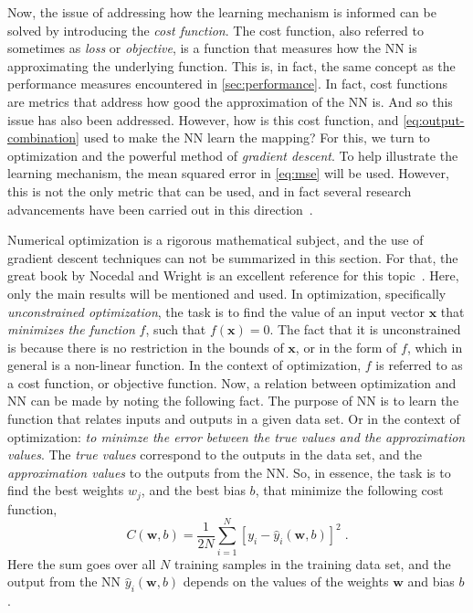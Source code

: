 Now, the issue of addressing how the learning mechanism is informed can be solved by 
introducing the \emph{cost function}. The cost function, also referred to sometimes as 
\emph{loss} or \emph{objective}, is a function that measures how the NN is approximating 
the underlying function. This is, in fact, the same concept as the performance measures 
encountered in \autoref{sec:performance}. In fact, cost functions are metrics that address 
how good the approximation of the NN is. And so this issue has also been addressed. 
However, how is this cost function, and \autoref{eq:output-combination} used to make the NN 
learn the mapping? For this, we turn to optimization and the powerful method of \emph{gradient descent}. To help illustrate the learning mechanism, the mean squared error in 
\autoref{eq:mse} will be used. However, this is not the only metric that can be used, and 
in fact several research advancements have been carried out in this direction~\cite{fontenla-romeroNewConvexObjective2010,liDiversityPromotingObjectiveFunction2016}.

Numerical optimization is a rigorous mathematical subject, and the use of gradient descent techniques can not be summarized in this section. For that, the great book by Nocedal and Wright is an excellent reference for this topic~\cite{nocedalNumericalOptimization2006}.
Here, only the main results will be mentioned and used. In optimization, specifically \emph{unconstrained optimization}, the task is to find the value of an input vector \(\mathbf{x}\) that \emph{minimizes the function} \(f\), such that \(f(\mathbf{x}) = 0\). The fact that it is unconstrained is because there is no restriction in the bounds of \(\mathbf{x}\), or in the form of \(f\), which in general is a non-linear function. In the context of optimization, \(f\) is referred to as a cost function, or objective function.
Now, a relation between optimization and NN can be made by noting the following fact. The 
purpose of NN is to learn the function that relates inputs and outputs in a given data set. 
Or in the context of optimization: \emph{to minimze the error between the true values and 
the approximation values}. The \emph{true values} correspond to the outputs in the data 
set, and the \emph{approximation values} to the outputs from the NN. So, in essence, the 
task is to find the best weights \(w_j\), and the best bias \(b\), that minimize the 
following cost function,
\begin{equation}
    C(\mathbf{w}, b) = \frac{1}{2 N} \sum_{i=1}^{N} { \left[y_i - \hat{y}_{i}(\mathbf{w}, b) \right] }^2
    \; .
    \label{eq:cost-nn}
\end{equation}
Here the sum goes over all $N$ training samples in the training data set, and the output 
from the NN \(\hat{y}_{i}(\mathbf{w}, b)\) depends on the values of the weights
\(\mathbf{w}\) and bias \(b\).

